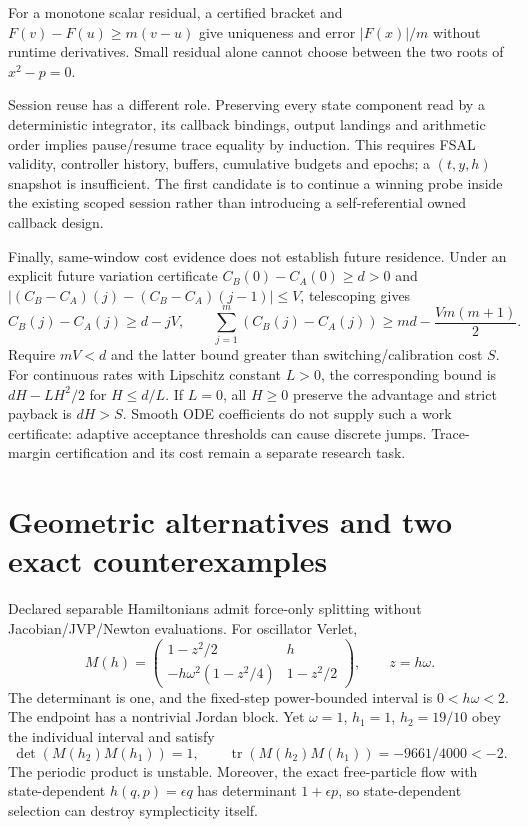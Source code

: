 \documentclass[aps,pra,reprint,onecolumn,11pt,notitlepage,nofootinbib]{revtex4-2}
\begin{document}
For a monotone scalar residual, a certified bracket and
$F(v)-F(u)\ge m(v-u)$ give uniqueness and error $|F(x)|/m$ without
runtime derivatives. Small residual alone cannot choose between the two
roots of $x^2-p=0$.

Session reuse has a different role. Preserving every state component read
by a deterministic integrator, its callback bindings, output landings and
arithmetic order implies pause/resume trace equality by induction. This
requires FSAL validity, controller history, buffers, cumulative budgets and
epochs; a $(t,y,h)$ snapshot is insufficient. The first candidate is to
continue a winning probe inside the existing scoped session rather than
introducing a self-referential owned callback design.

Finally, same-window cost evidence does not establish future residence.
Under an explicit future variation certificate
$C_B(0)-C_A(0)\ge d>0$ and
$|(C_B-C_A)(j)-(C_B-C_A)(j-1)|\le V$, telescoping gives
\begin{equation}
 C_B(j)-C_A(j)\ge d-jV,\qquad
 \sum_{j=1}^{m}(C_B(j)-C_A(j))\ge md-\frac{Vm(m+1)}2.
\end{equation}
Require $mV<d$ and the latter bound greater than switching/calibration cost
$S$. For continuous rates with Lipschitz constant $L>0$, the corresponding
bound is $dH-LH^2/2$ for $H\le d/L$. If $L=0$, all $H\ge0$ preserve the
advantage and strict payback is $dH>S$.
Smooth ODE coefficients do not supply such a work certificate: adaptive
acceptance thresholds can cause discrete jumps. Trace-margin certification
and its cost remain a separate research task.

\section{Geometric alternatives and two exact counterexamples}
Declared separable Hamiltonians admit force-only splitting without
Jacobian/JVP/Newton evaluations. For oscillator Verlet,
\begin{equation}
 M(h)=\begin{pmatrix}1-z^2/2&h\\
 -h\omega^2(1-z^2/4)&1-z^2/2\end{pmatrix},\qquad z=h\omega.
\end{equation}
The determinant is one, and the fixed-step power-bounded interval is
$0<h\omega<2$. The endpoint has a nontrivial Jordan block. Yet
$\omega=1$, $h_1=1$, $h_2=19/10$ obey the individual interval and satisfy
\begin{equation}
 \det(M(h_2)M(h_1))=1,\qquad
 \operatorname{tr}(M(h_2)M(h_1))=-9661/4000<-2.
\end{equation}
The periodic product is unstable. Moreover, the exact free-particle flow
with state-dependent $h(q,p)=\epsilon q$ has determinant $1+\epsilon p$,
so state-dependent selection can destroy symplecticity itself.
\end{document}
